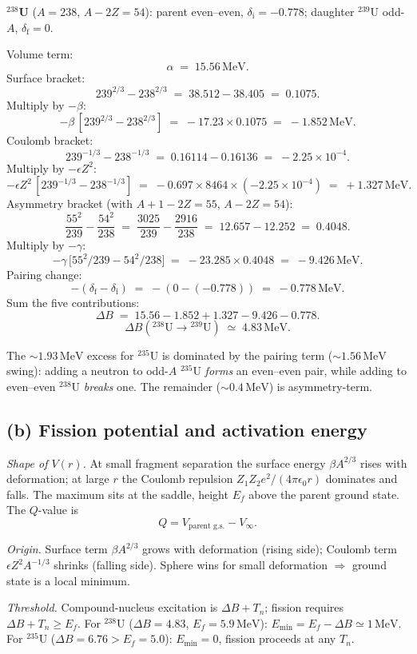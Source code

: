 \documentclass[11pt]{article}
\begin{document}
\textbf{$^{238}$U} ($A=238$, $A-2Z=54$): parent even--even, $\delta_\text{i}=-0.778$; daughter $^{239}$U odd-$A$, $\delta_\text{f}=0$.

Volume term:
\[
\alpha\;=\;15.56\,\text{MeV}.
\]
Surface bracket:
\[
239^{2/3}-238^{2/3}\;=\;38.512-38.405\;=\;0.1075.
\]
Multiply by $-\beta$:
\[
-\beta\,[239^{2/3}-238^{2/3}]\;=\;-17.23\times 0.1075\;=\;-1.852\,\text{MeV}.
\]
Coulomb bracket:
\[
239^{-1/3}-238^{-1/3}\;=\;0.16114-0.16136\;=\;-2.25\times 10^{-4}.
\]
Multiply by $-\epsilon Z^{2}$:
\[
-\epsilon Z^{2}\,[239^{-1/3}-238^{-1/3}]\;=\;-0.697\times 8464\times(-2.25\times 10^{-4})\;=\;+1.327\,\text{MeV}.
\]
Asymmetry bracket (with $A+1-2Z=55$, $A-2Z=54$):
\[
\frac{55^{2}}{239}-\frac{54^{2}}{238}\;=\;\frac{3025}{239}-\frac{2916}{238}\;=\;12.657-12.252\;=\;0.4048.
\]
Multiply by $-\gamma$:
\[
-\gamma\,\bigl[55^{2}/239-54^{2}/238\bigr]\;=\;-23.285\times 0.4048\;=\;-9.426\,\text{MeV}.
\]
Pairing change:
\[
-(\delta_\text{f}-\delta_\text{i})\;=\;-(0-(-0.778))\;=\;-0.778\,\text{MeV}.
\]
Sum the five contributions:
\[
\Delta B\;=\;15.56-1.852+1.327-9.426-0.778.
\]
\begin{equation}
\Delta B(^{238}\text{U}\to{}^{239}\text{U})\;\simeq\;\boxed{4.83\,\text{MeV}}.
\end{equation}

The $\sim 1.93\,\text{MeV}$ excess for $^{235}$U is dominated by the pairing term ($\sim 1.56\,\text{MeV}$ swing): adding a neutron to odd-$A$ $^{235}$U \emph{forms} an even--even pair, while adding to even--even $^{238}$U \emph{breaks} one. The remainder ($\sim 0.4\,\text{MeV}$) is asymmetry-term.

\subsection*{(b) Fission potential and activation energy}

\emph{Shape of $V(r)$.} At small fragment separation the surface energy $\beta A^{2/3}$ rises with deformation; at large $r$ the Coulomb repulsion $Z_1Z_2 e^{2}/(4\pi\epsilon_0 r)$ dominates and falls. The maximum sits at the saddle, height $E_f$ above the parent ground state. The $Q$-value is
\[
Q=V_\text{parent g.s.}-V_\infty.
\]

\emph{Origin.} Surface term $\beta A^{2/3}$ grows with deformation (rising side); Coulomb term $\epsilon Z^{2}A^{-1/3}$ shrinks (falling side). Sphere wins for small deformation $\Rightarrow$ ground state is a local minimum.

\emph{Threshold.} Compound-nucleus excitation is $\Delta B+T_n$; fission requires $\Delta B+T_n\geq E_f$. For $^{238}$U ($\Delta B=4.83$, $E_f=5.9\,\text{MeV}$): $E_\text{min}=E_f-\Delta B\simeq 1\,\text{MeV}$. For $^{235}$U ($\Delta B=6.76>E_f=5.0$): $E_\text{min}=0$, fission proceeds at any $T_n$.
\end{document}
